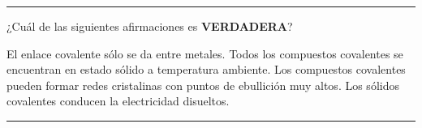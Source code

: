 \documentclass[answers,addpoints,14pt]{exam}
\newcommand{\halmos}{\vspace*{-4mm}
	
					\begin{flushright}
						\rule{1mm}{2.5mm} 
					\end{flushright}\vspace*{-4mm}
						
					  }
\renewcommand{\qed}{\halmos}
\begin{document}
\begin{questions}
\begin{question}[1]
	\end{question}
	\qed
\vspace{-1ex}
		
%
%





\begin{question}[1] ¿Cuál de las siguientes afirmaciones es \textbf{\small{VERDADERA}}?
	\begin{checkboxes} 
			\choice El enlace covalente sólo se da entre metales.			
			\choice Todos los compuestos covalentes se encuentran en estado sólido a temperatura ambiente.	
			\CorrectChoice Los compuestos covalentes pueden formar redes cristalinas con puntos de ebullición muy altos.
			\choice Los sólidos covalentes conducen la electricidad disueltos.	
	\end{checkboxes}
\end{question}
\qed
	



\end{questions}
\end{document}
